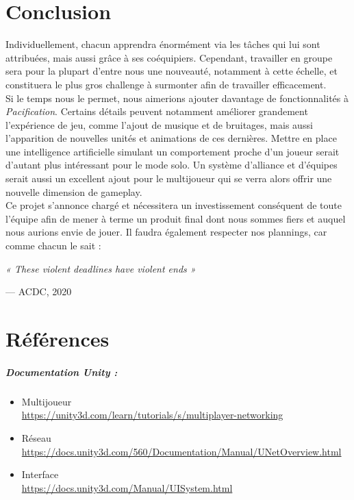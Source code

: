 \documentclass[12pt]{report}
\begin{document}
\chapter{Conclusion}

Individuellement, chacun apprendra énormément via les tâches qui lui sont attribuées, mais aussi grâce à ses coéquipiers. Cependant, travailler en groupe sera pour la plupart d’entre nous une nouveauté, notamment à cette échelle, et constituera le plus gros challenge à surmonter afin de travailler efficacement.\\

Si le temps nous le permet, nous aimerions ajouter davantage de fonctionnalités à \textit{Pacification}. Certains détails peuvent notamment améliorer grandement l’expérience de jeu, comme l’ajout de musique et de bruitages, mais aussi l’apparition de nouvelles unités et animations de ces dernières. Mettre en place une intelligence artificielle simulant un comportement proche d’un joueur serait d’autant plus intéressant pour le mode solo. Un système d’alliance et d’équipes serait aussi un excellent ajout pour le multijoueur qui se verra alors offrir une nouvelle dimension de gameplay.\\

 Ce projet s’annonce chargé et nécessitera un investissement conséquent de toute l’équipe afin de mener à terme un produit final dont nous sommes fiers et auquel nous aurions envie de jouer. Il faudra également respecter nos plannings, car comme chacun le sait :


\epigraph{\textit{« These violent deadlines have violent ends »}}{--- \textup{ACDC, 2020}}

\chapter{Références}

\paragraph{\bfseries{Documentation Unity :}}

\begin{itemize}[label=\textbullet]
\item Multijoueur \\ \url{https://unity3d.com/learn/tutorials/s/multiplayer-networking}
\item Réseau \\ \url{https://docs.unity3d.com/560/Documentation/Manual/UNetOverview.html}
\item Interface \\ \url{https://docs.unity3d.com/Manual/UISystem.html}
\end{itemize}
\end{document}
